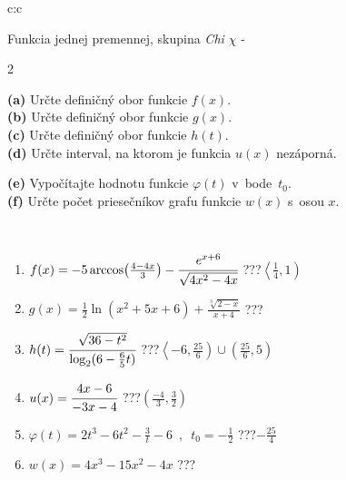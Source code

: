 \documentclass[10pt]{report}
\begin{document}
\begin{tabular}{c:c}
\begin{minipage}[c][104.5mm][t]{0.5\linewidth}
\begin{center}
\vspace{7mm}
{\huge Funkcia jednej premennej, skupina \textit{Chi $\chi$} -}\\[5mm]
\begin{minipage}{0.95\linewidth}
\begin{center}
{\small \begin{multicols}{2} \raggedright
\textbf{(a)} Určte definičný obor funkcie \(f(x)\). \\[1mm]
\textbf{(b)} Určte definičný obor funkcie \(g(x)\). \\[1mm]
\textbf{(c)} Určte definičný obor funkcie \(h(t)\). \\[1mm]
\textbf{(d)} Určte interval, na ktorom je funkcia \(u(x)\) nezáporná. \par \columnbreak
\textbf{(e)} Vypočítajte hodnotu funkcie \(\varphi(t)\) v~bode~\(t_0\). \\[1mm]
\textbf{(f)} Určte počet priesečníkov grafu funkcie \(w(x)\) s~osou \(x\). \\[1mm]
\end{multicols}
}
\end{center}
\end{minipage}
\\[4mm]
\begin{minipage}{0.79\linewidth}
\begin{center}
\begin{varwidth}{\linewidth}
\begin{enumerate}
\small
\item $f(x) = -5\arccos\!\left( \frac{4-4x}{3} \right) - \cfrac{e^{x+6}}{\sqrt{4x^2-4x}}$\quad \dotfill\; ???\;\dotfill \quad $\left\langle\frac{1}{4} , 1\right)$
\item $g(x) = \frac{1}{2} \ln{\!(x^2+5x+6)}+\frac{\sqrt[3]{2-x}}{x+4}$\quad \dotfill\; ???\;\dotfill {}
\item $h(t) = \cfrac{\sqrt{36-t^2}}{\log_2(6-\frac{6}{5}t)}$\quad \dotfill\; ???\;\dotfill \quad $\left\langle-6 , \frac{25}{6}\right)\cup\left(\frac{25}{6} , 5\right)$
\item $u(x) = \cfrac{4x-6}{-3x-4}$\quad \dotfill\; ???\;\dotfill \quad $\left(\frac{-4}{3} , \frac{3}{2}\right)$
\item $\varphi(t) = 2t^3-6t^2-\frac{3}{t}-6 \enspace , \enspace t_0=-\frac{1}{2}$\quad \dotfill\; ???\;\dotfill \quad $-\frac{25}{4}$
\item $w(x) = 4x^3-15x^2-4x$\quad \dotfill\; ???\;\dotfill {}

\end{enumerate}
\end{varwidth}
\end{center}
\end{minipage}
\end{center}
\end{minipage}
\end{tabular}
\end{document}
